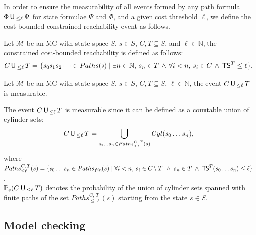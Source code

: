 In order to ensure the measurability of all events formed by any path formula
$\Phi \,\text{\sffamily U}\,_{\leq \ell}\, \Psi$ for state formulae $\Psi$ and $\Phi$, and a given cost threshold $\ell$,
we define the cost-bounded constrained reachability event as follows.
\begin{definition}
  Let $\mathcal{M}$ be an MC with state space $S$, $s \in S$, $C, T \subseteq S$, and $\ell \in \mathbb{N}$, the constrained cost-bounded reachability is defined as follows:
    \[
      C \,\text{\sffamily U}\,_{\leq \ell}\, T = \{
        s_0s_1s_2 \dots \in Paths(s) \; | \; \exists n \in \mathbb{N}, \, s_n \in T \, \wedge \, \forall i < n,\, s_i \in C \, \wedge \, \text{\sffamily TS}^T \leq \ell
      \}.
    \]
\end{definition}

\begin{lemma}
  Let $\mathcal{M}$ be an MC with state space $S$,
  $s \in S$, $C, T \subseteq S$, $\ell \in \mathbb{N}$, the event $C \,\text{\sffamily U}\,_{\leq \ell}\, T$ is measurable.
\end{lemma}
\begin{proof2}
  The event $C \,\text{\sffamily U}\,_{\leq \ell} \, T$ is measurable since it can be defined as a countable union of cylinder sets:
    \[C \,\text{\sffamily U}\,_{\leq \ell}\, T = \bigcup_{s_0 \dots s_n \in Paths^{C, \, T}_{\leq \ell}(s)} Cyl(s_0 \dots s_n),
  \]
  where
    $Paths^{C, \,  T}_{\leq \ell}(s)= \{ s_0 \dots s_n \in Paths_{fin}(s) \; | \; \forall i<n,  \, s_i \in C \setminus T \,   \; \wedge \; s_n \in T \; \wedge \; \text{\sffamily TS}^T(s_0\dots s_n) \leq \ell \}
    $.\\[0.3em]
  $\mathbb{P}_s(C \,\text{\sffamily U}\,_{\leq \ell} \, T)$ denotes the probability of the union of cylinder sets spanned with finite paths of the set $Paths^{C, \, T}_{\leq \ell}(s)$ starting from the state $s \in S$.

\end{proof2}

\subsection*{Model checking}

